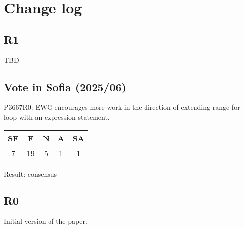 \section{Change log}

\subsection{R1}

TBD

\subsection{Vote in Sofia (2025/06)}

P3667R0: EWG encourages more work in the direction of extending range-for loop with an expression statement.

\vspace{1em}
\begin{tabular}{|c|c|c|c|c|}
\hline
SF & F & N & A & SA\\
\hline\hline
7 & 19 & 5 & 1 & 1\\
\hline
\end{tabular}

\vspace{1em}

Result: consensus

\subsection{R0}

Initial version of the paper.
